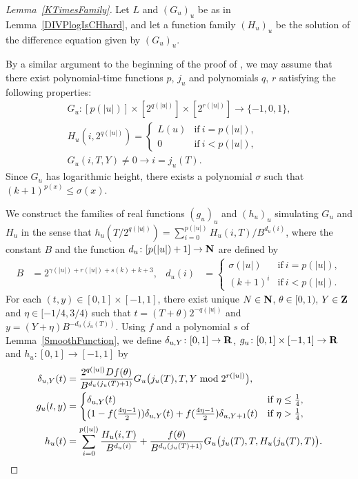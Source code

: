 \begin{proof}[Lemma~\ref{KTimesFamily}]
Let $L$ and $(G_u)_u$ be as in Lemma~\ref{DIVPlogIsCHhard},
and let a function family $(H_u)_u$ be the solution of the difference equation given by $(G_u)_u$.

By a similar argument to the beginning of the proof of \cite[Lemma 4.1]{kawamura2010lipschitz},
we may assume that there exist polynomial-time functions $p$, $j_u$
and polynomials $q$, $r$ satisfying the following properties:
\begin{gather}
 G_u \colon [p(|u|)] \times [2^{q(|u|)}] \times [2^{r(|u|)}] \to \{-1, 0, 1\},
 \\
 H_u(i, 2^{q(|u|)}) = \begin{cases}
		       L(u) & \text{if} \ i=p(|u|), \\
		       0 & \text{if} \ i<p(|u|), 
		      \end{cases}
 \\
 G_u(i, T, Y) \neq 0 \to i = j_u(T).
\end{gather}
Since $G_u$ has logarithmic height,
there exists a polynomial $\sigma$ such that $(k+1)^{p(x)} \le \sigma(x)$.


We construct the families of real functions $(g_u)_u$ and $(h_u)_u$ simulating $G _u$ and $H _u$ 
in the sense that $h_u(T/2^{q(|u|)}) = \sum^{p(|u|)}_{i = 0}H_u(i, T)/B^{d_u(i)}$, 
where the constant $B$ and the function $d_u \colon [p(|u|)+1] \to \mathbf N$ are 
defined by
  \begin{align}
   B &= 2^{\gamma(|u|) + r(|u|) + s(k) + k + 3}, 
   &
   d_u(i) &= 
   \begin{cases}
    \sigma(|u|) & \text{if} \ i=p(|u|), 
    \\
    (k+1)^i & \text{if} \ i<p(|u|).
   \end{cases}
  \end{align}
For each $(t, y) \in [0,1] \times [-1, 1]$,
there exist unique $N \in \mathbf N$, $\theta \in [0,1)$, $Y \in \mathbf Z$ and $\eta \in [-1/4, 3/4)$
such that $t = (T + \theta)2^{-q(|u|)}$ and $y = (Y + \eta)B^{-d_u(j_u(T))}$.
Using $f$ and a polynomial $s$ of Lemma~\ref{SmoothFunction},
we define 
$\delta_{u,Y} \colon [0,1] \to \mathbf R$,
$
g _u \colon [0, 1] \times [-1, 1] \to \mathbf R
$ and $
h _u \colon [0, 1] \to [-1, 1]
$ by
  \begin{align}
    \label{eq:delta}
   \delta_{u, Y} (t) &= \frac{2^{q(|u|)} D f(\theta)}{B^{d_u(j_u(T)+1)}} 
   G_u \bigl( j_u(T), T, Y \bmod 2^{r(|u|)} \bigr),
   \\
  \label{eq:gu}
  g_u(t,y) 
  &= \begin{cases}
     \delta_{u, Y}(t)
     & \text{if} \ \eta \le \frac 1 4, 
     \\
     ( 1-f ( \frac{4\eta-1}{2})) \delta_{u, Y}(t)
     + f ( \frac{4\eta-1}{2}) \delta_{u,Y+1}(t)
     & \text{if} \ \eta > \frac 1 4,
    \end{cases}
   \\
  h_u(t) 
   &= \sum^{p(|u|)}_{i=0} \frac{H_u(i, T)}{B^{d_u(i)}}  
  + \frac{f(\theta)}{B^{d_u(j_u(T)+1)}} G_u \bigl( j_u(T), T, H_u(j_u(T), T) \bigr) .
  \label{eq:hu}
  \end{align}


\end{proof}
